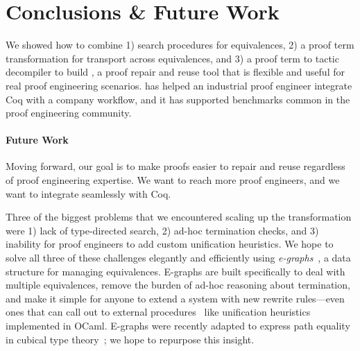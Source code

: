 \section{Conclusions \& Future Work}
\label{sec:discussion}

We showed how to combine 1) search procedures for equivalences, 2) a proof term transformation for transport across equivalences,
and 3) a proof term to tactic decompiler to build \toolname,
a proof repair and reuse tool that is flexible and useful for real proof engineering scenarios.
\toolname has helped an industrial proof engineer integrate Coq with a company workflow,
and it has supported benchmarks common in the proof engineering community.


\paragraph{Future Work}

Moving forward, our goal is to make proofs easier to repair and reuse regardless of proof engineering expertise.
We want to reach more proof engineers, and we want \toolname to integrate seamlessly with Coq.

Three of the biggest problems that we encountered scaling up the \toolname transformation were 1) lack of type-directed search,
2) ad-hoc termination checks, and 3) inability for proof engineers to add custom unification heuristics.
We hope to solve all three of these challenges elegantly and efficiently using \textit{e-graphs}~\cite{egraph1},
a data structure %
for managing equivalences.
E-graphs are built specifically to deal with multiple equivalences,
remove the burden of ad-hoc reasoning about termination,
and make it simple for anyone to extend a system with new
rewrite rules---even ones that can call out to external procedures~\cite{egraph5} 
like unification heuristics implemented in OCaml.
E-graphs were recently adapted to express path equality in cubical type theory~\cite{egraph6}; we hope to repurpose this insight.

